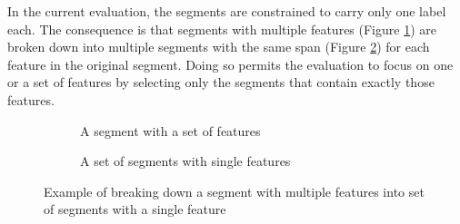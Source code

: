      In the current evaluation, the segments are constrained to carry only one label each. The consequence is that segments with multiple features (Figure \ref{fig:segment-multiple}) are broken down into multiple segments with the same span (Figure \ref{fig:segment-simple}) for each feature in the original segment. Doing so permits the evaluation to focus on one or a set of features by selecting only the segments that contain exactly those features. 

    \begin{figure}[!ht]
        \centering
        \begin{subfigure}[b]{0.47\textwidth}
            \centering
            \caption{A segment with a set of features}
            \label{fig:segment-multiple}
        \end{subfigure}
        \begin{subfigure}[b]{0.47\textwidth}
            \centering
            \caption{A set of segments with single features}
            \label{fig:segment-simple}
        \end{subfigure}
        \caption{Example of breaking down a segment with multiple features into set of segments with a single feature}
        \label{fig:segment-breackdown}
    \end{figure}

